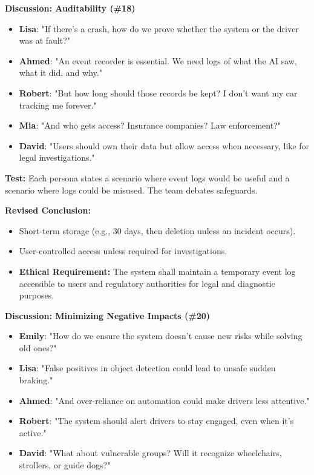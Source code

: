 \begin{tcolorbox}
  \vspace{0.5em}
  \textbf{Discussion: Auditability (\#18)}
  
  \begin{itemize}
      \item \textbf{Lisa}: "If there’s a crash, how do we prove whether the system or the driver was at fault?"
      \item \textbf{Ahmed}: "An event recorder is essential. We need logs of what the AI saw, what it did, and why."
      \item \textbf{Robert}: "But how long should those records be kept? I don’t want my car tracking me forever."
      \item \textbf{Mia}: "And who gets access? Insurance companies? Law enforcement?"
      \item \textbf{David}: "Users should own their data but allow access when necessary, like for legal investigations."
  \end{itemize}
  
  \textbf{Test:} Each persona states a scenario where event logs would be useful and a scenario where logs could be misused. The team debates safeguards.
  
  \textbf{Revised Conclusion:}
  \begin{itemize}
      \item Short-term storage (e.g., 30 days, then deletion unless an incident occurs).
      \item User-controlled access unless required for investigations.
      \item \textbf{Ethical Requirement:} The system shall maintain a temporary event log accessible to users and regulatory authorities for legal and diagnostic purposes.
  \end{itemize}
  
  \vspace{0.5em}
  \textbf{Discussion: Minimizing Negative Impacts (\#20)}
  
  \begin{itemize}
      \item \textbf{Emily}: "How do we ensure the system doesn’t cause new risks while solving old ones?"
      \item \textbf{Lisa}: "False positives in object detection could lead to unsafe sudden braking."
      \item \textbf{Ahmed}: "And over-reliance on automation could make drivers less attentive."
      \item \textbf{Robert}: "The system should alert drivers to stay engaged, even when it’s active."
      \item \textbf{David}: "What about vulnerable groups? Will it recognize wheelchairs, strollers, or guide dogs?"
  \end{itemize}
  

\end{tcolorbox}
